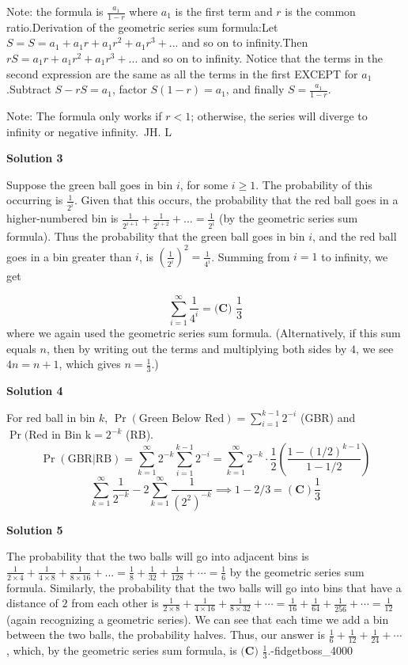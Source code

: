 \begin{enumerate}
 
Note: the formula is $\frac{a_{1}}{1-r}$ where $a_{1}$ is the first term and $r$ is the common ratio.Derivation of the geometric series sum formula:Let $S = S=a_{1}+a_{1}r+a_{1}r^{2}+a_{1}r^{3}+...$ and so on to infinity.Then $rS=a_{1}r+a_{1}r^{2}+a_{1}r^{3}+...$ and so on to infinity. Notice that the terms in the second expression are the same as all the terms in the first EXCEPT for $a_{1}$.Subtract $S-rS=a_{1}$, factor $S\left(1-r\right)=a_{1}$, and finally $S=\frac{a_{1}}{1-r}$.

 Note: The formula only works if $r<1$; otherwise, the series will diverge to infinity or negative infinity.~JH. L

 



\textbf{Solution 3}

Suppose the green ball goes in bin $i$, for some $i \ge 1$. The probability of this occurring is $\frac{1}{2^i}$. Given that this occurs, the probability that the red ball goes in a higher-numbered bin is $\frac{1}{2^{i+1}} + \frac{1}{2^{i+2}} + \ldots = \frac{1}{2^i}$ (by the geometric series sum formula). Thus the probability that the green ball goes in bin $i$, and the red ball goes in a bin greater than $i$, is $\left(\frac{1}{2^i}\right)^2 = \frac{1}{4^i}$. Summing from $i=1$ to infinity, we get

 
 \[\sum_{i=1}^{\infty} \frac{1}{4^i} = \boxed{\textbf{(C) } \frac{1}{3}}\]where we again used the geometric series sum formula. (Alternatively, if this sum equals $n$, then by writing out the terms and multiplying both sides by $4$, we see $4n = n+1$, which gives $n = \frac{1}{3}$.)

 



\textbf{Solution 4}

For red ball in bin $k$, $\Pr(\text{Green Below Red})=\sum\limits_{i=1}^{k-1}2^{-i}$ (GBR) and $\Pr(\text{Red in Bin k}=2^{-k}$ (RB). 
 \[\Pr(\text{GBR}|\text{RB})=\sum\limits_{k=1}^{\infty}2^{-k}\sum\limits_{i=1}^{k-1}2^{-i}=\sum\limits_{k=1}^{\infty}2^{-k}\cdot\frac{1}{2}(\frac{1-(1/2)^{k-1}}{1-1/2})\]
 \[\sum\limits_{k=1}^{\infty}\frac{1}{2^{-k}}-2\sum\limits_{k=1}^\infty\frac{1}{(2^2)^{-k}}\implies 1-2/3=\boxed{(\textbf{C}) \frac{1}{3}}\]




\textbf{Solution 5}

The probability that the two balls will go into adjacent bins is $\frac{1}{2\times4} + \frac{1}{4\times8} + \frac{1}{8 \times 16} + ... = \frac{1}{8} + \frac{1}{32} + \frac{1}{128} + \cdots = \frac{1}{6}$ by the geometric series sum formula. Similarly, the probability that the two balls will go into bins that have a distance of $2$ from each other is $\frac{1}{2 \times 8} + \frac{1}{4 \times 16} + \frac{1}{8 \times 32} + \cdots = \frac{1}{16} + \frac{1}{64} + \frac{1}{256} + \cdots = \frac{1}{12}$ (again recognizing a geometric series). We can see that each time we add a bin between the two balls, the probability halves. Thus, our answer is $\frac{1}{6} + \frac{1}{12} + \frac{1}{24} + \cdots$, which, by the geometric series sum formula, is $\boxed{\textbf{(C) } \frac{1}{3}}$.-fidgetboss\_4000


\end{enumerate}
